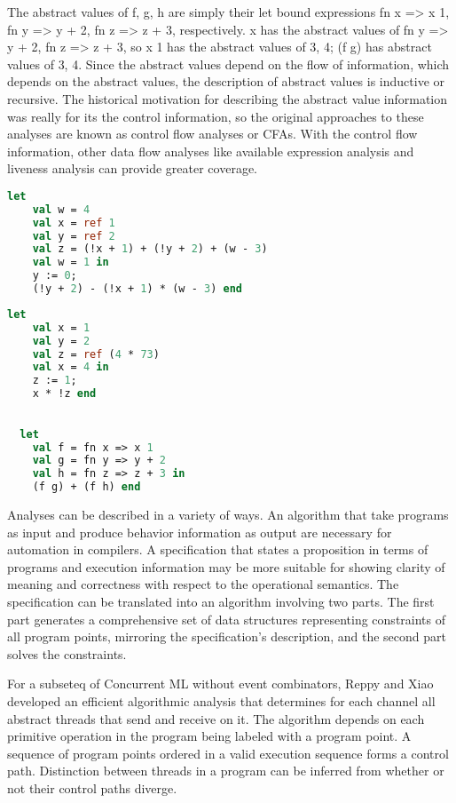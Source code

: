 \documentclass{article}
\begin{document}
The abstract values of f, g, h are simply their let bound expressions {fn x => x 1},
{fn y => y + 2},  {fn z => z + 3}, respectively.  x has the abstract values of
{fn y => y + 2, fn z => z + 3}, so x 1 has the abstract values of {3, 4}; (f g) has abstract
values of {3, 4}.  Since the abstract values depend on the flow of information, which depends
on the abstract values, the description of abstract values is inductive or recursive.  The
historical motivation for describing the abstract value information was really for its the
control information, so the original approaches to these analyses are known as control flow
analyses or CFAs.  With the control flow information, other data flow analyses like available
expression analysis and liveness analysis can provide greater coverage.


\begin{lstlisting}[language=ML, escapechar=\%]
  let
    val w = 4
    val x = ref 1
    val y = ref 2
    val z = (!x + 1) + (!y + 2) + (w - 3)
    val w = 1 in
    y := 0;
    (!y + 2) - (!x + 1) * (w - 3) end
  \end{lstlisting}

\begin{lstlisting}[language=ML, escapechar=\%]
  let 
    val x = 1  
    val y = 2
    val z = ref (4 * 73)
    val x = 4 in 
    z := 1; 
    x * !z end
  \end{lstlisting}

\begin{lstlisting}[language=ML, escapechar=\%]

  let 
    val f = fn x => x 1
    val g = fn y => y + 2
    val h = fn z => z + 3 in 
    (f g) + (f h) end

\end{lstlisting}




Analyses can be described in a variety of ways.  An algorithm that take programs as input and
produce behavior information as output are necessary for automation in compilers.  A
specification that states a proposition in terms of programs and execution information may be
more suitable for showing clarity of meaning and correctness with respect to the operational
semantics.  The specification can be translated into an algorithm involving two parts.  The
first part generates a comprehensive set of data structures representing constraints of all
program points, mirroring the specification's description, and the second part solves the
constraints.

For a subseteq of Concurrent ML without event combinators, Reppy and  Xiao developed an
efficient algorithmic analysis that determines for each channel all abstract threads that send
and receive on it.  The algorithm depends on each primitive operation in the program being
labeled with a program point.  A sequence of program points ordered in a valid execution
sequence forms a control path.  Distinction between threads in a program can be inferred from
whether or not their control paths diverge.  
\end{document}

